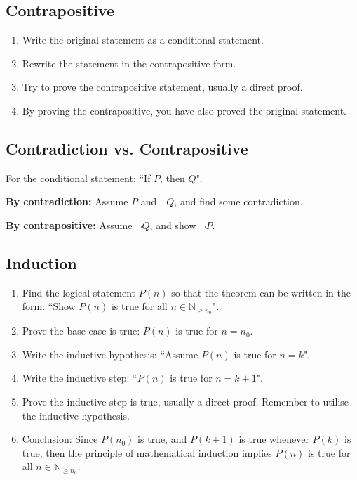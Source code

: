 \documentclass{article}
\newcommand*{\N}{\mathbb{N}}
\theoremstyle{plain}
\numberwithin{theorem}{subsection}
\theoremstyle{definition}
\numberwithin{definition}{subsection}
\theoremstyle{remark}
\numberwithin{note}{section}
\begin{document}
\subsection{Contrapositive}
\begin{enumerate}
    \item Write the original statement as a conditional statement.
    \item Rewrite the statement in the contrapositive form.
    \item Try to prove the contrapositive statement, usually a direct proof.
    \item By proving the contrapositive, you have also proved the original statement.
\end{enumerate}
%
\subsection{Contradiction vs. Contrapositive}
\underline{For the conditional statement: ``If $P$, then $Q$".}

\noindent\textbf{By contradiction:} Assume $P$ and $\neg{Q}$, and find some contradiction.

\noindent\textbf{By contrapositive:} Assume $\neg{Q}$, and show $\neg{P}$.
%
\subsection{Induction}
\begin{enumerate}
    \item Find the logical statement $P(n)$ so that the theorem can be written in the form: ``Show $P(n)$ is true for all $n \in \N_{\geqslant n_0}$".
    \item Prove the base case is true: $P(n)$ is true for $n=n_0$.
    \item Write the inductive hypothesis: ``Assume $P(n)$ is true for $n=k$".
    \item Write the inductive step: ``$P(n)$ is true for $n=k+1$".
    \item Prove the inductive step is true, usually a direct proof. Remember to utilise the inductive hypothesis.
    \item Conclusion: Since $P(n_0)$ is true, and $P(k+1)$ is true whenever $P(k)$ is true, then the principle of mathematical induction implies $P(n)$ is true for all $n\in \N_{\geqslant n_0}$.
\end{enumerate}
%
\end{document}
